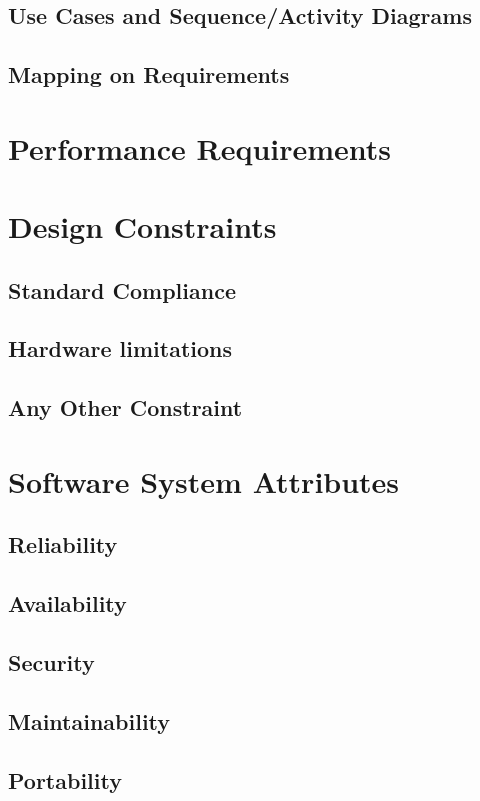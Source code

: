 \subsection{Use Cases and Sequence/Activity Diagrams}
\subsection{Mapping on Requirements}

\section{Performance Requirements}

\section{Design Constraints}

\subsection{Standard Compliance}
\subsection{Hardware limitations}
\subsection{Any Other Constraint}

\section{Software System Attributes}

\subsection{Reliability}
\subsection{Availability}
\subsection{Security}
\subsection{Maintainability}
\subsection{Portability}